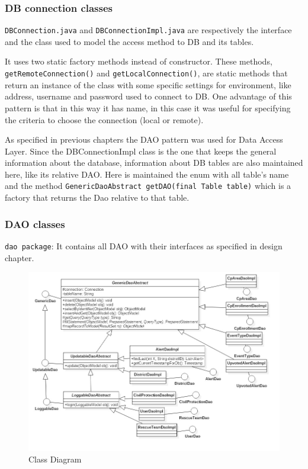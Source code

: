 \documentclass[a4paper,12pt]{report}
\begin{document}
\subsubsection{DB connection classes}
\texttt{DBConnection.java} and \texttt{DBConnectionImpl.java} are respectively the interface and the class used to model the access method to DB and its tables.

It uses two static factory methods instead of constructor. These methods, \\ \texttt{getRemoteConnection()} and \texttt{getLocalConnection()}, are static methods that return an instance of the class with some specific settings for environment, like address, username and password used to connect to DB. One advantage of this pattern is that in this way it has name, in this case it was useful for specifying the criteria to choose the connection (local or remote).

As specified in previous chapters the DAO pattern was used for Data Access Layer. Since the DBConnectionImpl class is the one that keeps the general information about the database, information about DB tables are also maintained here, like its relative DAO. Here is maintained the enum with all table's name and the method \texttt{GenericDaoAbstract getDAO(final Table table)} which is a factory that returns the Dao relative to that table.

\subsubsection{DAO classes}
\texttt{dao package}: It contains all DAO with their interfaces as specified in design chapter.

\begin{figure}[ht]
\centering
\includegraphics[width=\textwidth]{figures/ClassDiagram.jpg}
\caption{Class Diagram}
\label{fig:ClassDiagram}
\end{figure}
\end{document}
